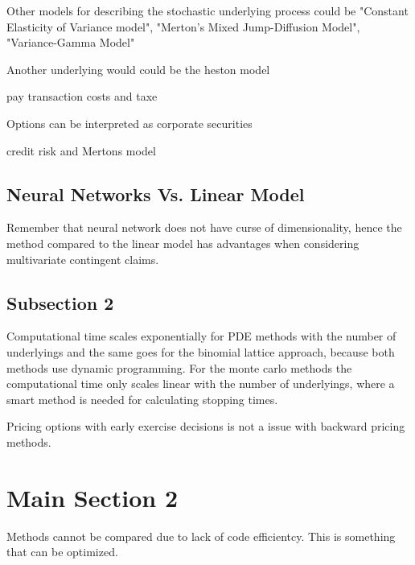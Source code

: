 Other models for describing the stochastic underlying process could be "Constant Elasticity of Variance model", "Merton's Mixed Jump-Diffusion Model", "Variance-Gamma Model"

Another underlying would could be the heston model

pay transaction costs and taxe

Options can be interpreted as corporate securities

credit risk and Mertons model


\subsection{Neural Networks Vs. Linear Model}
Remember that neural network does not have curse of dimensionality, hence the method compared to the linear model has advantages when considering multivariate contingent claims.


\subsection{Subsection 2}
Computational time scales exponentially for PDE methods with the number of underlyings and the same goes for the binomial lattice approach, because both methods use dynamic programming. For the monte carlo methods the computational time only scales linear with the number of underlyings, where a smart method is needed for calculating stopping times.

Pricing options with early exercise decisions is not a issue with backward pricing methods.


\section{Main Section 2}
\parencite{liaw2018tune}
\parencite{FergusonRyan2018}

Methods cannot be compared due to lack of code efficientcy. This is something that can be optimized. 